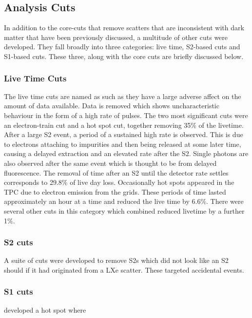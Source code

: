 \subsection{Analysis Cuts}
\par
In addition to the core-cuts that remove scatters that are inconsistent with dark matter that have been previously discussed, a multitude of other cuts were developed.
They fall broadly into three categories: live time, S2-based cuts and S1-based cuts.
These three, along with the core cuts are briefly discussed below.


\subsubsection{Live Time Cuts}
The live time cuts are named as such as they have a large adverse affect on the amount of data available.
Data is removed which shows uncharacteristic behaviour in the form of a high rate of pulses.
The two most significant cuts were an electron-train cut and a hot spot cut, together removing 35\% of the livetime.
After a large S2 event, a period of a sustained high rate is observed. 
This is due to electrons attaching to impurities and then being released at some later time, causing a delayed extraction and an elevated rate after the S2.
Single photons are also observed after the same event which is thought to be from delayed fluorescence.
The removal of time after an S2 until the detector rate settles corresponds to 29.8\% of live day loss.
Occasionally hot spots appeared in the TPC due to electron emission from the grids. 
These periods of time lasted approximately an hour at a time and reduced the live time by 6.6\%.
There were several other cuts in this category which combined reduced livetime by a further 1\%.

\subsubsection{S2 cuts}
A suite of cuts were developed to remove S2s which did not look like an S2 should if it had originated from a LXe scatter.
These targeted accidental events.

\subsubsection{S1 cuts}


developed a hot spot where 

